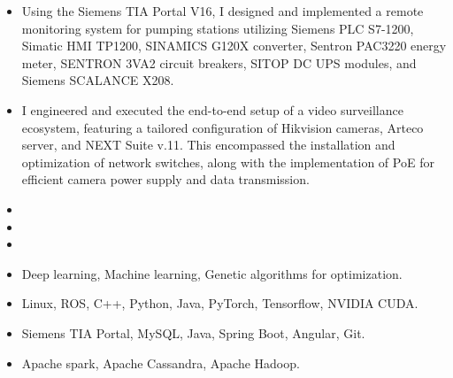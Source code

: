\documentclass[10pt,a4paper,ragged2e]{altacv}
\begin{document}
\divider

\begin{itemize}
\item Using the Siemens TIA Portal V16, I designed and implemented a remote monitoring system for pumping stations utilizing Siemens PLC S7-1200, Simatic HMI TP1200, SINAMICS G120X converter, Sentron PAC3220 energy meter, SENTRON 3VA2 circuit breakers, SITOP DC UPS modules, and Siemens SCALANCE X208.
\item I engineered and executed the end-to-end setup of a video surveillance ecosystem, featuring a tailored configuration of Hikvision cameras, Arteco server, and NEXT Suite v.11. This encompassed the installation and optimization of network switches, along with the implementation of PoE for efficient camera power supply and data transmission.
\end{itemize}


\smallskip
\begin{itemize}
\item {}
\item {}
\item {}
\end{itemize}

\smallskip
\begin{itemize}
\item Deep learning, Machine learning, Genetic algorithms for optimization.
\item Linux, ROS, C++, Python, Java, PyTorch, Tensorflow, NVIDIA CUDA.
\item Siemens TIA Portal, MySQL, Java, Spring Boot, Angular, Git.
\item Apache spark, Apache Cassandra, Apache Hadoop.
\end{itemize}
\clearpage
\nocite{*}
\end{document}

